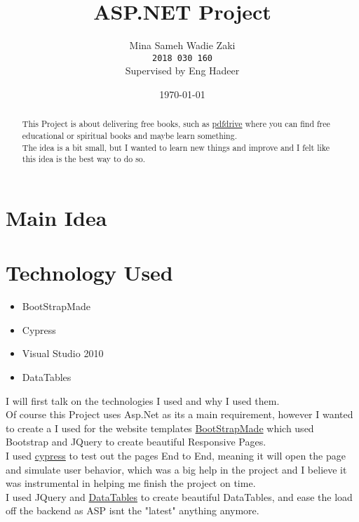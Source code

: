 \documentclass[a4paper,ft=14pt]{article}
\begin{document}
\begin{titlepage}
\title{ASP.NET Project}
\author{Mina Sameh Wadie Zaki \\ \texttt{2018 030 160} \\ Supervised by Eng Hadeer}
\date{\today}
\maketitle
\end{titlepage}

\section{Main Idea}
\begin{abstract}
This Project is about delivering free books, such as \href{pdfdrive.com}{pdfdrive} where you can find free educational or spiritual
books and maybe learn something.\\
The idea is a bit small, but I wanted to learn new things and improve and I felt like this idea is the 
best way to do so.
\end{abstract}

\section{Technology Used}
\begin{itemize}
	\item BootStrapMade
	\item Cypress
	\item Visual Studio 2010
	\item DataTables
\end{itemize}

I will first talk on the technologies I used and why I used them. \\
Of course this Project uses Asp.Net as its a main requirement, however I wanted to create a
I used for the website templates \href{https://bootstrapmade.com}{BootStrapMade} which used Bootstrap and JQuery 
to create beautiful Responsive Pages. \\
I used \href{https://www.cypress.io/}{cypress} to test out the pages End to End, meaning it will open the page and simulate user behavior, 
which was a big help in the project and I believe it was instrumental in helping me finish the project on time.\\
I used JQuery and \href{https://www.datatables.net/}{DataTables} to create beautiful DataTables, and ease the load off the backend as ASP isnt the "latest" anything anymore.
\end{document}
